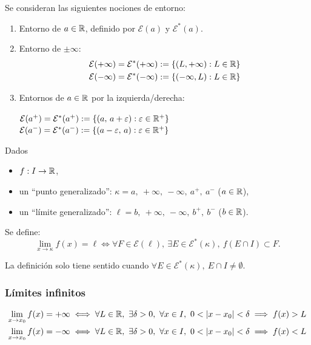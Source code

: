 \documentclass[11pt,a4paper]{article}
\newcommand{\cE}{\mathcal{E}}           %
\begin{document}
Se consideran las siguientes nociones de entorno:
\begin{enumerate}
  \item Entorno de $a\in\mathbb{R}$, definido por $\cE(a)$ y $\cE^*(a)$.
  \item Entorno de $\pm\infty$:
  \begin{align*}
    \cE(+\infty) = \cE^*(+\infty) &:= \{(L,+\infty):L\in\R\}\\
    \cE(-\infty) = \cE^*(-\infty) &:= \{(-\infty,L):L\in\R\}
  \end{align*}
  \item Entornos de $a\in\mathbb{R}$ por la izquierda/derecha:
  \begin{center}
  $\cE(a^+) = \cE^*(a^+) := \{(a,\, a+\varepsilon):\varepsilon\in\R^+\}$\\[0.3em]
  $\cE(a^-) = \cE^*(a^-) := \{(a-\varepsilon,\, a):\varepsilon\in\R^+\}$
  \end{center}
\end{enumerate}

\begin{definicion}
Dados
\begin{itemize}
  \item $f:I\to\mathbb{R}$,
  \item un ``punto generalizado'': $\kappa = a,\ +\infty,\ -\infty,\ a^+,\ a^-$ \quad ($a\in\mathbb{R}$),
  \item un ``límite generalizado'': $\ell = b,\ +\infty,\ -\infty,\ b^+,\ b^-$ \quad ($b\in\mathbb{R}$).
\end{itemize}
Se define:
\[
  \lim_{x\to\kappa}f(x)=\ell \iff \forall F\in\cE(\ell),\ \exists E\in\cE^*(\kappa),\ f(E\cap I)\subset F.
\]
\end{definicion}

\begin{observacion}
La definición solo tiene sentido cuando $\forall E\in\cE^*(\kappa),\ E\cap I\neq\emptyset$.
\end{observacion}

\subsubsection*{Límites infinitos}

\begin{align*}
  \lim_{x\to x_0}f(x)=+\infty &\iff \forall L\in\R,\ \exists\delta>0,\ \forall x\in I,\ 0<\abs{x-x_0}<\delta\implies f(x)>L\\
  \lim_{x\to x_0}f(x)=-\infty &\iff \forall L\in\R,\ \exists\delta>0,\ \forall x\in I,\ 0<\abs{x-x_0}<\delta\implies f(x)<L
\end{align*}
\end{document}
